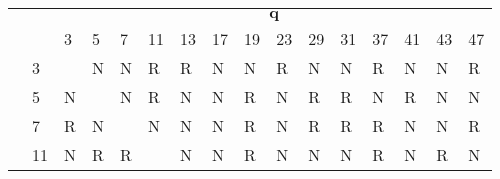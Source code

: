 \documentclass[17pt]{memoir}
\begin{document}
\arrayrulewidth=2pt
\begin{tabular}{@{}ll|llllllllllllll@{}}
                     &                          & \multicolumn{14}{c}{$\boldsymbol{q}$}                                                                                                                                                                                                                                                                                                                                                                                \\
                     &                          & 3                         & 5                         & 7                         & 11                        & 13                        & 17                        & 19                        & 23                        & 29                        & 31                        & 37                        & 41                        & 43                        & 47                        \\
\hline
                     & 3                        & \cellcolor[HTML]{000000}  & N                         & N                         & \cellcolor[HTML]{FAC22B}R & \cellcolor[HTML]{FAC22B}R & N                         & N                         & \cellcolor[HTML]{FAC22B}R & N                         & N                         & \cellcolor[HTML]{FAC22B}R & N                         & N                         & \cellcolor[HTML]{FAC22B}R \\
                     & 5                        & N                         & \cellcolor[HTML]{000000}  & N                         & \cellcolor[HTML]{FAC22B}R & N                         & N                         & \cellcolor[HTML]{FAC22B}R & N                         & \cellcolor[HTML]{FAC22B}R & \cellcolor[HTML]{FAC22B}R & N                         & \cellcolor[HTML]{FAC22B}R & N                         & N                         \\
                     & 7                        & \cellcolor[HTML]{FAC22B}R & N                         & \cellcolor[HTML]{000000}  & N                         & N                         & N                         & \cellcolor[HTML]{FAC22B}R & N                         & \cellcolor[HTML]{FAC22B}R & \cellcolor[HTML]{FAC22B}R & \cellcolor[HTML]{FAC22B}R & N                         & N                         & \cellcolor[HTML]{FAC22B}R \\
                     & 11                       & N                         & \cellcolor[HTML]{FAC22B}R & \cellcolor[HTML]{FAC22B}R & \cellcolor[HTML]{000000}  & N                         & N                         & \cellcolor[HTML]{FAC22B}R & N                         & N                         & N                         & \cellcolor[HTML]{FAC22B}R & N                         & \cellcolor[HTML]{FAC22B}R & N                         \\

\end{tabular}
\end{document}
